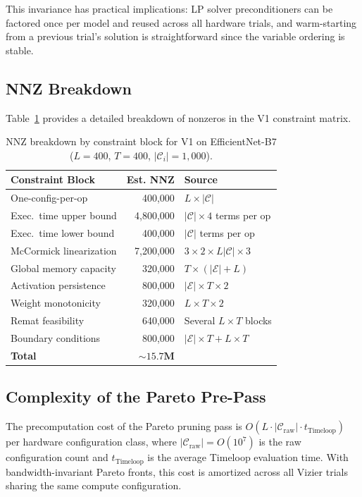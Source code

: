 This invariance has practical implications: LP solver preconditioners can be factored once per model and reused across all hardware trials, and warm-starting from a previous trial's solution is straightforward since the variable ordering is stable.

\subsection{NNZ Breakdown}

Table~\ref{tab:nnz_breakdown} provides a detailed breakdown of nonzeros in the V1 constraint matrix.

\begin{table}[h]
\centering
\caption{NNZ breakdown by constraint block for V1 on EfficientNet-B7 ($L=400$, $T=400$, $|\mathcal{C}_i|=1{,}000$).}
\label{tab:nnz_breakdown}
\small
\begin{tabular}{lrl}
\toprule
\textbf{Constraint Block} & \textbf{Est. NNZ} & \textbf{Source} \\
\midrule
One-config-per-op & 400,000 & $L \times |\mathcal{C}|$ \\
Exec.\ time upper bound & 4,800,000 & $|\mathcal{C}| \times 4$ terms per op \\
Exec.\ time lower bound & 400,000 & $|\mathcal{C}|$ terms per op \\
McCormick linearization & 7,200,000 & $3 \times 2 \times L|\mathcal{C}| \times 3$ \\
Global memory capacity & 320,000 & $T \times (|\mathcal{E}| + L)$ \\
Activation persistence & 800,000 & $|\mathcal{E}| \times T \times 2$ \\
Weight monotonicity & 320,000 & $L \times T \times 2$ \\
Remat feasibility & 640,000 & Several $L \times T$ blocks \\
Boundary conditions & 800,000 & $|\mathcal{E}| \times T + L \times T$ \\
\midrule
\textbf{Total} & $\mathbf{\sim 15.7\text{M}}$ & \\
\bottomrule
\end{tabular}
\end{table}

\subsection{Complexity of the Pareto Pre-Pass}

\begin{proposition}
The precomputation cost of the Pareto pruning pass is $O(L \cdot |\mathcal{C}_{\text{raw}}| \cdot t_{\text{Timeloop}})$ per hardware configuration class, where $|\mathcal{C}_{\text{raw}}| = O(10^7)$ is the raw configuration count and $t_{\text{Timeloop}}$ is the average Timeloop evaluation time. With bandwidth-invariant Pareto fronts, this cost is amortized across all Vizier trials sharing the same compute configuration.
\end{proposition}

